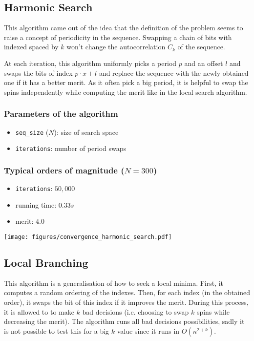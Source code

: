 \documentclass{article}
\begin{document}
\subsection{Harmonic Search}

  This algorithm came out of the idea that the definition of the problem seems
  to raise a concept of periodicity in the sequence. Swapping a chain of bits
  with indexed spaced by $k$ won't change the autocorrelation $C_k$ of the
  sequence.

  At each iteration, this algorithm uniformly picks a period $p$ and an offset
  $l$ and swaps the bits of index $p \cdot x + l$ and replace the sequence with
  the newly obtained one if it has a better merit. As it often pick a big
  period, it is helpful to swap the spins independently while computing the
  merit like in the local search algorithm.

  \begin{multicols}{2}
    \subsubsection*{Parameters of the algorithm}
      \begin{itemize}
        \item \texttt{seq\_size} ($N$): size of search space
        \item \texttt{iterations}: number of period swaps
      \end{itemize}

    \subsubsection*{Typical orders of magnitude ($N = 300$)}
      \begin{itemize}
        \item \texttt{iterations}: $50,000$
        \item running time: $0.33s$
        \item merit: $4.0$
      \end{itemize}

    \vphantom{0}
  \columnbreak
    \texttt{[image: figures/convergence\_harmonic\_search.pdf]}
  \end{multicols}


\subsection{Local Branching}

  This algorithm is a generalisation of how to seek a local minima. First, it
  computes a random ordering of the indexes. Then, for each index (in the
  obtained order), it swaps the bit of this index if it improves the merit.
  During this process, it is allowed to to make $k$ bad decisions (i.e.
  choosing to swap $k$ spins while decreasing the merit). The algorithm runs
  all bad decisions possibilities, sadly it is not possible to test this for a
  big $k$ value since it runs in $O(n^{2+k})$.
\end{document}
